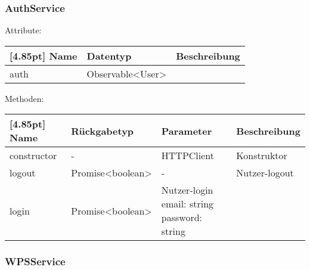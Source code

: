             \subsubsection{AuthService}
            
                Attribute:
                \begin{center}
                	\renewcommand{\arraystretch}{1.5}
                    \setlength\tabcolsep{5pt}
                	\begin{tabularx}{\textwidth}{|l|l|X|}
                		\hline
                        \rowcolor[gray]{0.75}[4.85pt]            		
                	    Name & Datentyp & Beschreibung \\ \hline
                        auth & Observable<User> & \\ \hline
                	\end{tabularx}
                \end{center}
                
                Methoden:
        		\begin{center}
        		    \setlength\tabcolsep{5pt}
                	\renewcommand{\arraystretch}{1.5}
                    	\begin{tabularx}{\textwidth}{|l|l|l|X|}
                    	\hline
                    	\rowcolor[gray]{0.75}[4.85pt]
                		Name & Rückgabetyp & Parameter & Beschreibung \\ \hline 
                        constructor & - & HTTPClient & Konstruktor \\ \hline
                        logout & Promise<boolean> & - & Nutzer-logout \\ \hline
                        login & Promise<boolean> & Nutzer-login \thead{email: string\\password: string} & \\ \hline
                    	\end{tabularx}
        		\end{center}
            
            
            \subsubsection{WPSService}
                
